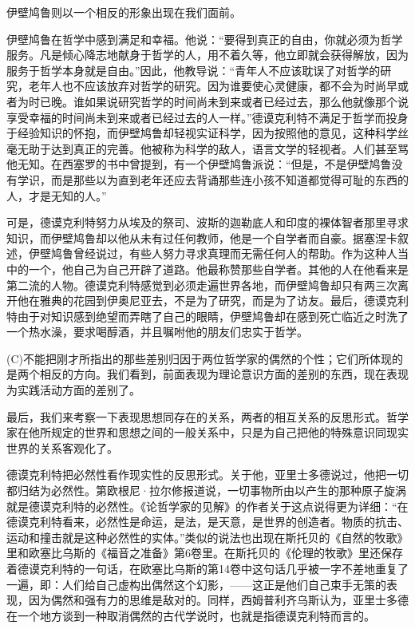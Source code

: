 \documentclass[a4paper,twoside,12pt,AutoFakeBold]{ctexart}
\begin{document}
伊壁鸠鲁则以一个相反的形象出现在我们面前。

伊壁鸠鲁在哲学中感到满足和幸福。他说：“要得到真正的自由，你就必须为哲学服务。凡是倾心降志地献身于哲学的人，用不着久等，他立即就会获得解放，因为服务于哲学本身就是自由。”因此，他教导说：“青年人不应该耽误了对哲学的研究，老年人也不应该放弃对哲学的研究。因为谁要使心灵健康，都不会为时尚早或者为时已晚。谁如果说研究哲学的时间尚未到来或者已经过去，那么他就像那个说享受幸福的时间尚未到来或者已经过去的人一样。”德谟克利特不满足于哲学而投身于经验知识的怀抱，而伊壁鸠鲁却轻视实证科学，因为按照他的意见，这种科学丝毫无助于达到真正的完善。他被称为科学的敌人，语言文学的轻视者。人们甚至骂他无知。在西塞罗的书中曾提到，有一个伊壁鸠鲁派说：“但是，不是伊壁鸠鲁没有学识，而是那些以为直到老年还应去背诵那些连小孩不知道都觉得可耻的东西的人，才是无知的人。”

可是，德谟克利特努力从埃及的祭司、波斯的迦勒底人和印度的裸体智者那里寻求知识，而伊壁鸠鲁却以他从未有过任何教师，他是一个自学者而自豪。据塞涅卡叙述，伊壁鸠鲁曾经说过，有些人努力寻求真理而无需任何人的帮助。作为这种人当中的一个，他自己为自己开辟了道路。他最称赞那些自学者。其他的人在他看来是第二流的人物。德谟克利特感觉到必须走遍世界各地，而伊壁鸠鲁却只有两三次离开他在雅典的花园到伊奥尼亚去，不是为了研究，而是为了访友。最后，德谟克利特由于对知识感到绝望而弄瞎了自己的眼睛，伊壁鸠鲁却在感到死亡临近之时洗了一个热水澡，要求喝醇酒，并且嘱咐他的朋友们忠实于哲学。

(C)不能把刚才所指出的那些差别归因于两位哲学家的偶然的个性；它们所体现的是两个相反的方向。我们看到，前面表现为理论意识方面的差别的东西，现在表现为实践活动方面的差别了。

最后，我们来考察一下表现思想同存在的关系，两者的相互关系的反思形式。哲学家在他所规定的世界和思想之间的一般关系中，只是为自己把他的特殊意识同现实世界的关系客观化了。

德谟克利特把必然性看作现实性的反思形式。关于他，亚里士多德说过，他把一切都归结为必然性。第欧根尼·拉尔修报道说，一切事物所由以产生的那种原子旋涡就是德谟克利特的必然性。《论哲学家的见解》的作者关于这点说得更为详细：“在德谟克利特看来，必然性是命运，是法，是天意，是世界的创造者。物质的抗击、运动和撞击就是这种必然性的实体。”类似的说法也出现在斯托贝的《自然的牧歌》里和欧塞比乌斯的《福音之准备》第6卷里。在斯托贝的《伦理的牧歌》里还保存着德谟克利特的一句话，在欧塞比乌斯的第14卷中这句话几乎被一字不差地重复了一遍，即：人们给自己虚构出偶然这个幻影，——这正是他们自己束手无策的表现，因为偶然和强有力的思维是敌对的。同样，西姆普利齐乌斯认为，亚里士多德在一个地方谈到一种取消偶然的古代学说时，也就是指德谟克利特而言的。
\end{document}
